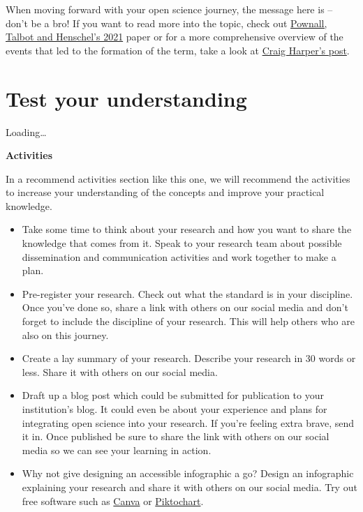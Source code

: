 \documentclass[
]{book}
\begin{document}
When moving forward with your open science journey, the message here is -- don't be a bro! If you want to read more into the topic, check out \href{https://journals.sagepub.com/doi/full/10.1177/03616843211029255}{Pownall, Talbot and Henschel's 2021} paper or for a more comprehensive overview of the events that led to the formation of the term, take a look at \href{https://craigharper.substack.com/p/bropen-science?s=r}{Craig Harper's post}.

\hypertarget{test-your-understanding-7}{%
\section{Test your understanding}\label{test-your-understanding-7}}

Loading\ldots{}

\textbf{Activities}

In a recommend activities section like this one, we will recommend the activities to increase your understanding of the concepts and improve your practical knowledge.

\begin{itemize}
\item
  Take some time to think about your research and how you want to share the knowledge that comes from it. Speak to your research team about possible dissemination and communication activities and work together to make a plan.
\item
  Pre-register your research. Check out what the standard is in your discipline. Once you've done so, share a link with others on our social media and don't forget to include the discipline of your research. This will help others who are also on this journey.
\item
  Create a lay summary of your research. Describe your research in 30 words or less. Share it with others on our social media.
\item
  Draft up a blog post which could be submitted for publication to your institution's blog. It could even be about your experience and plans for integrating open science into your research. If you're feeling extra brave, send it in. Once published be sure to share the link with others on our social media so we can see your learning in action.
\item
  Why not give designing an accessible infographic a go? Design an infographic explaining your research and share it with others on our social media. Try out free software such as \href{http://www.canva.com/}{Canva} or \href{https://piktochart.com/}{Piktochart}.
\end{itemize}
\end{document}
